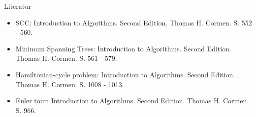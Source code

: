 \begin{frame}{Literatur}
  \begin{itemize}
  \item SCC: Introduction to Algorithms. Second Edition. Thomas H. Cormen. S. 552 - 560.
  \item Minimum Spanning Trees: Introduction to Algorithms. Second Edition. Thomas H. Cormen. S. 561 - 579.
  \item Hamiltonian-cycle problem: Introduction to Algorithms. Second Edition. Thomas H. Cormen. S. 1008 - 1013.
  \item Euler tour: Introduction to Algorithms. Second Edition. Thomas H. Cormen. S. 966.
  \end{itemize}	
\end{frame}
